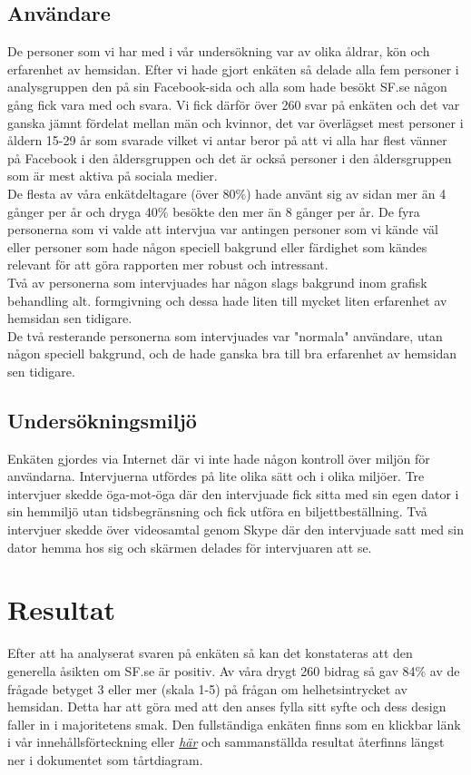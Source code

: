 \documentclass[swedish,a4paper,11pt]{article}
\begin{document}
\subsection{Användare} 
De personer som vi har med i vår undersökning var av olika åldrar, kön och erfarenhet av hemsidan. Efter vi hade gjort enkäten så delade alla fem personer i analysgruppen den på sin Facebook-sida och alla som hade besökt SF.se någon gång fick vara med och svara. Vi fick därför över 260 svar på enkäten och det var ganska jämnt fördelat mellan män och kvinnor, det var överlägset mest personer i åldern 15-29 år som svarade vilket vi antar beror på att vi alla har flest vänner på Facebook i den åldersgruppen och det är också personer i den åldersgruppen som är mest aktiva på sociala medier.\\ De flesta av våra enkätdeltagare (över 80\%) hade använt sig av sidan mer än 4 gånger per år och dryga 40\% besökte den mer än 8 gånger per år. De fyra personerna som vi valde att intervjua var antingen personer som vi kände väl eller personer som hade någon speciell bakgrund eller färdighet som kändes relevant för att göra rapporten mer robust och intressant.\\
Två av personerna som intervjuades har någon slags bakgrund inom grafisk behandling alt. formgivning och dessa hade liten till mycket liten erfarenhet av hemsidan sen tidigare.\\
De två resterande personerna som intervjuades var "normala" användare, utan någon speciell bakgrund, och de hade ganska bra till bra erfarenhet av hemsidan sen tidigare.

\subsection{Undersökningsmiljö} 
Enkäten gjordes via Internet där vi inte hade någon kontroll över miljön för användarna. Intervjuerna utfördes på lite olika sätt och i olika miljöer. Tre intervjuer skedde öga-mot-öga där den intervjuade fick sitta med sin egen dator i sin hemmiljö utan tidsbegränsning och fick utföra en biljettbeställning. Två intervjuer skedde över videosamtal genom Skype där den intervjuade satt med sin dator hemma hos sig och skärmen delades för intervjuaren att se. 

\newpage
\section{Resultat}

Efter att ha analyserat svaren på enkäten så kan det konstateras att den generella åsikten om SF.se är positiv. Av våra drygt 260 bidrag så gav 84\% av de frågade betyget 3 eller mer (skala 1-5) på frågan om helhetsintrycket av hemsidan. Detta har att göra med att den anses fylla sitt syfte och dess design faller in i majoritetens smak. Den fullständiga enkäten finns som en klickbar länk i vår innehållsförteckning eller \href{https://docs.google.com/forms/d/1KFDziZeg0wwAXTIV-LeV9eBy-Oa-SH1aR7GebkXLKKI/viewform?c=0&w=1}{\textit{här}} och sammanställda resultat återfinns längst ner i dokumentet som tårtdiagram.\\
\end{document}
